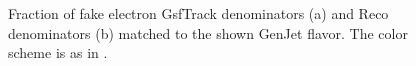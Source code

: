 \documentclass{cmspaper}
\begin{document}
\begin{figure}[htb]
\begin{center}
   \caption{Fraction of fake electron GsfTrack denominators (a) and Reco denominators (b) matched to the shown GenJet flavor. The color scheme is as in .}
   \label{fig:ElectronDenominator_JetFlavor}
\end{center}
\end{figure}
\end{document}
